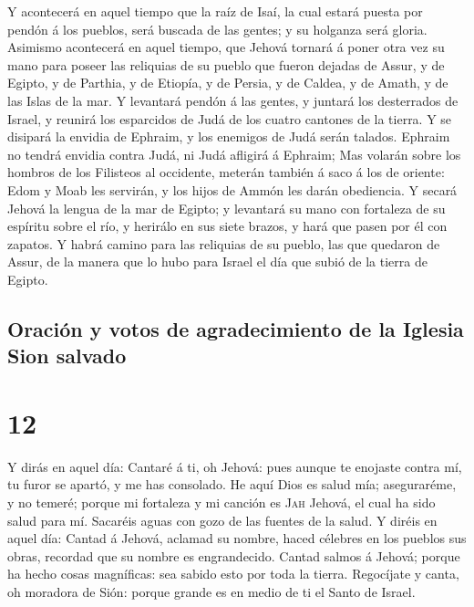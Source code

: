  Y acontecerá en aquel tiempo que la raíz de Isaí, la
cual estará puesta por pendón á los pueblos, será buscada de las gentes;
y su holganza será gloria.  Asimismo acontecerá en aquel
tiempo, que Jehová tornará á poner otra vez su mano para poseer las
reliquias de su pueblo que fueron dejadas de Assur, y de Egipto, y de
Parthia, y de Etiopía, y de Persia, y de Caldea, y de Amath, y de las
Islas de la mar.  Y levantará pendón á las gentes, y
juntará los desterrados de Israel, y reunirá los esparcidos de Judá de
los cuatro cantones de la tierra.  Y se disipará la
envidia de Ephraim, y los enemigos de Judá serán talados. Ephraim no
tendrá envidia contra Judá, ni Judá afligirá á Ephraim; 
Mas volarán sobre los hombros de los Filisteos al occidente, meterán
también á saco á los de oriente: Edom y Moab les servirán, y los hijos
de Ammón les darán obediencia.  Y secará Jehová la lengua
de la mar de Egipto; y levantará su mano con fortaleza de su espíritu
sobre el río, y herirálo en sus siete brazos, y hará que pasen por él
con zapatos.  Y habrá camino para las reliquias de su
pueblo, las que quedaron de Assur, de la manera que lo hubo para Israel
el día que subió de la tierra de Egipto.

\hypertarget{oraciuxf3n-y-votos-de-agradecimiento-de-la-iglesia-sion-salvado}{%
\subsection{Oración y votos de agradecimiento de la Iglesia Sion
salvado}\label{oraciuxf3n-y-votos-de-agradecimiento-de-la-iglesia-sion-salvado}}

\hypertarget{section-11}{%
\section{12}\label{section-11}}

 Y dirás en aquel día: Cantaré á ti, oh Jehová: pues
aunque te enojaste contra mí, tu furor se apartó, y me has consolado.
 He aquí Dios es salud mía; aseguraréme, y no temeré;
porque mi fortaleza y mi canción es \textsc{Jah} Jehová, el cual ha sido
salud para mí.  Sacaréis aguas con gozo de las fuentes de
la salud.  Y diréis en aquel día: Cantad á Jehová, aclamad
su nombre, haced célebres en los pueblos sus obras, recordad que su
nombre es engrandecido.  Cantad salmos á Jehová; porque ha
hecho cosas magníficas: sea sabido esto por toda la tierra.
 Regocíjate y canta, oh moradora de Sión: porque grande es
en medio de ti el Santo de Israel.

